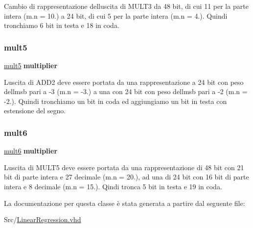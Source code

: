 Cambio di rappresentazione dell\textquotesingle{}uscita di M\+U\+L\+T3 da 48 bit, di cui 11 per la parte intera (m.\+n = 10.) a 24 bit, di cui 5 per la parte intera (m.\+n = 4.). Quindi tronchiamo 6 bit in testa e 18 in coda. \mbox{\label{class_linear_regression_1_1_structural_aed551c15ed15fe4ab7d0c073a7e33b9c}} 
\subsubsection{\texorpdfstring{mult5}{mult5}}
{\footnotesize\ttfamily \hyperlink{class_linear_regression_1_1_structural_aed551c15ed15fe4ab7d0c073a7e33b9c}{mult5} {\bfseries \textcolor{vhdlchar}{multiplier}\textcolor{vhdlchar}{ }} \hspace{0.3cm}{\ttfamily [Instantiation]}}

L\textquotesingle{}uscita di A\+D\+D2 deve essere portata da una rappresentazione a 24 bit con peso dell\textquotesingle{}msb pari a -\/3 (m.\+n = -\/3.) a una con 24 bit con peso dell\textquotesingle{}msb pari a -\/2 (m.\+n = -\/2.). Quindi tronchiamo un bit in coda ed aggiungiamo un bit in testa con estensione del segno. \mbox{\label{class_linear_regression_1_1_structural_afa25d32bbc0881baaa179e393e1964c5}} 
\subsubsection{\texorpdfstring{mult6}{mult6}}
{\footnotesize\ttfamily \hyperlink{class_linear_regression_1_1_structural_afa25d32bbc0881baaa179e393e1964c5}{mult6} {\bfseries \textcolor{vhdlchar}{multiplier}\textcolor{vhdlchar}{ }} \hspace{0.3cm}{\ttfamily [Instantiation]}}

L\textquotesingle{}uscita di M\+U\+L\+T5 deve essere portata da una rappresentazione di 48 bit con 21 bit di parte intera e 27 decimale (m.\+n = 20.), ad una di 24 bit con 16 bit di parte intera e 8 decimale (m.\+n = 15.). Qindi tronca 5 bit in testa e 19 in coda. 

La documentazione per questa classe è stata generata a partire dal seguente file\+:\begin{DoxyCompactItemize}
\item 
Src/\hyperlink{_linear_regression_8vhd}{Linear\+Regression.\+vhd}\end{DoxyCompactItemize}
